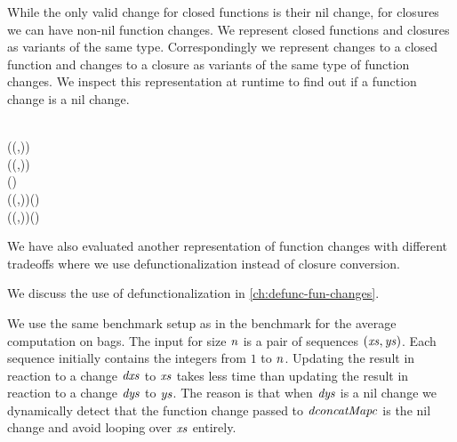 While the only valid change for closed functions is their nil change, for closures
we can have non-nil function changes. We represent closed functions and closures
as variants of the same type. Correspondingly we represent changes to a closed
function and changes to a closure as variants of the same type of function changes.
We inspect this representation at runtime to find out if a function change
is a nil change.
\begin{hscode}\SaveRestoreHook
{}%
%
%
%
\>[3]{}\;\;\;\;\;\<[E]%
\\
\>[3]{}\<[5]%
\>[5]{}\mathrel{:\mkern-1mu:}(\to (,))\to {}\;\;\;\<[E]%
\\
\>[3]{}\<[5]%
\>[5]{}\mathrel{:\mkern-1mu:}(\to {}\to (,))\to {}\to {}\;\;\;\<[E]%
\\[\blanklineskip]%
\>[3]{}\;\Delta (\;\;\;)\;\<[E]%
\\
\>[3]{}\<[5]%
\>[5]{}\mathrel{:\mkern-1mu:}(\Delta {}\to {}\to (\Delta {},))\to \Delta (\;\;\;){}\<[E]%
\\
\>[3]{}\<[5]%
\>[5]{}\mathrel{:\mkern-1mu:}(\Delta {}\to \Delta {}\to {}\to (\Delta {},))\to \Delta {}\to \Delta (\;\;\;){}\<[E]%
\ColumnHook
\end{hscode}\resethooks

We have also evaluated another representation of function changes with different
tradeoffs where we use defunctionalization instead of closure conversion.
\begin{poplForThesis}
We discuss the use of defunctionalization in \cref{ch:defunc-fun-changes}.
\end{poplForThesis}

We use the same benchmark setup as in the benchmark for the average computation on bags.
The input for size \ensuremath{\Varid{n}} is a pair of sequences \ensuremath{(\Varid{xs},\Varid{ys})}. Each sequence
initially contains the integers from \ensuremath{\mathrm{1}} to \ensuremath{\Varid{n}}. Updating the result in reaction
to a change \ensuremath{\Varid{dxs}} to \ensuremath{\Varid{xs}} takes less time than updating the result in reaction
to a change \ensuremath{\Varid{dys}} to \ensuremath{\Varid{ys}}. The reason is that when \ensuremath{\Varid{dys}} is a nil change we
dynamically detect that the function change passed to \ensuremath{\Varid{dconcatMapc}} is the nil
change and avoid looping over \ensuremath{\Varid{xs}} entirely.

